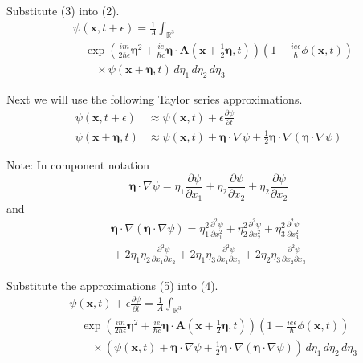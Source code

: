 \documentclass[12pt]{article}
\newcommand\INT{\int_{\mathbb R^3}}
\begin{document}
Substitute (3) into (2).
\begin{align*}
&\psi(\mathbf x,t+\epsilon)=
\frac{1}{A}\INT
\\
&\quad{}\exp
\left(
\frac{im}{2\hbar\epsilon}\boldsymbol\eta^2
+\frac{ie}{\hbar c}\boldsymbol\eta\cdot\mathbf A\left(\mathbf x+\tfrac{1}{2}\boldsymbol\eta,t\right)
\right)
\left(1-\frac{ie\epsilon}{\hbar}\phi(\mathbf x,t)\right)
\\
&\quad\quad{}\times\psi(\mathbf x+\boldsymbol\eta,t)
\,d\eta_1\,d\eta_2\,d\eta_3
\tag{4}
\end{align*}

Next we will use the following Taylor series approximations.
\begin{equation*}
\begin{aligned}
\psi(\mathbf x,t+\epsilon)&\approx\psi(\mathbf x,t)+\epsilon\frac{\partial\psi}{\partial t}
\\
\psi(\mathbf x+\boldsymbol\eta,t)&\approx\psi(\mathbf x,t)+\boldsymbol\eta\cdot\nabla\psi
+\tfrac{1}{2}\boldsymbol\eta\cdot\nabla(\boldsymbol\eta\cdot\nabla\psi)
\end{aligned}
\tag{5}
\end{equation*}

Note: In component notation
\begin{equation*}
\boldsymbol\eta\cdot\nabla\psi=
\eta_1\frac{\partial\psi}{\partial x_1}+
\eta_2\frac{\partial\psi}{\partial x_2}+
\eta_2\frac{\partial\psi}{\partial x_2}
\end{equation*}
and
\begin{multline*}
\boldsymbol\eta\cdot\nabla(\boldsymbol\eta\cdot\nabla\psi)=
\eta_1^2\frac{\partial^2\psi}{\partial x_1^2}
+\eta_2^2\frac{\partial^2\psi}{\partial x_2^2}
+\eta_3^2\frac{\partial^2\psi}{\partial x_3^2}
\\
{}+2\eta_1\eta_2\frac{\partial^2\psi}{\partial x_1\partial x_2}
+2\eta_1\eta_3\frac{\partial^2\psi}{\partial x_1\partial x_3}
+2\eta_2\eta_3\frac{\partial^2\psi}{\partial x_2\partial x_3}
\end{multline*}

Substitute the approximations (5) into (4).
\begin{align*}
&\psi(\mathbf x,t)+\epsilon\frac{\partial\psi}{\partial t}=
\frac{1}{A}\INT
\\
&\quad{}\exp
\left(
\frac{im}{2\hbar\epsilon}\boldsymbol\eta^2
+\frac{ie}{\hbar c}\boldsymbol\eta\cdot\mathbf A\left(\mathbf x+\tfrac{1}{2}\boldsymbol\eta,t\right)
\right)
\left(1-\frac{ie\epsilon}{\hbar}\phi(\mathbf x,t)\right)
\\
&\quad\quad{}\times
\left(
\psi(\mathbf x,t)+\boldsymbol\eta\cdot\nabla\psi
+\tfrac{1}{2}\boldsymbol\eta\cdot\nabla(\boldsymbol\eta\cdot\nabla\psi)
\right)
\,d\eta_1\,d\eta_2\,d\eta_3
\tag{6}
\end{align*}
\end{document}
